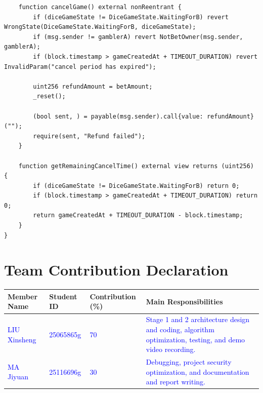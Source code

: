 \documentclass[10pt,a4paper]{article}
\begin{document}
\begin{lstlisting}
    function cancelGame() external nonReentrant {
        if (diceGameState != DiceGameState.WaitingForB) revert WrongState(DiceGameState.WaitingForB, diceGameState);
        if (msg.sender != gamblerA) revert NotBetOwner(msg.sender, gamblerA);
        if (block.timestamp > gameCreatedAt + TIMEOUT_DURATION) revert InvalidParam("cancel period has expired");
        
        uint256 refundAmount = betAmount;
        _reset();
        
        (bool sent, ) = payable(msg.sender).call{value: refundAmount}("");
        require(sent, "Refund failed");
    }
    
    function getRemainingCancelTime() external view returns (uint256) {
        if (diceGameState != DiceGameState.WaitingForB) return 0;
        if (block.timestamp > gameCreatedAt + TIMEOUT_DURATION) return 0;
        return gameCreatedAt + TIMEOUT_DURATION - block.timestamp;
    }
}
\end{lstlisting}

\newpage
\section*{Team Contribution Declaration}

\begin{table}[h]
\centering
\begin{tabularx}{\textwidth}{|X|X|X|X|}
\hline
\textbf{Member Name} & \textbf{Student ID} & \textbf{Contribution (\%)} & \textbf{Main Responsibilities} \\
\hline
\textcolor{blue}{LIU Xinsheng} & \textcolor{blue}{25065865g } & \textcolor{blue}{70} & \textcolor{blue}{Stage 1 and 2 architecture design and coding, algorithm optimization, testing, and demo video recording.} \\
\hline
\textcolor{blue}{MA Jiyuan} & \textcolor{blue}{25116696g} & \textcolor{blue}{30} & \textcolor{blue}{Debugging, project security optimization, and documentation and report writing.} \\
\hline
\end{tabularx}
\end{table}
\end{document}

